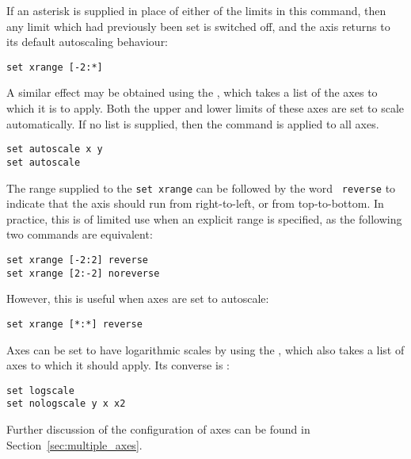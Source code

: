 If an asterisk is supplied in place of either of the limits in this command, then
any limit which had previously been set is switched off, and the axis returns to
its default autoscaling behaviour:

\begin{verbatim}
set xrange [-2:*]
\end{verbatim}

\noindent A similar effect may be obtained using the ,
which takes a list of the axes to which it is to apply. Both the upper and
lower limits of these axes are set to scale automatically. If no list is
supplied, then the command is applied to all axes.

\begin{verbatim}
set autoscale x y
set autoscale
\end{verbatim}

The range supplied to the {\tt set xrange} can be followed by the word {\tt
reverse} to indicate that the axis should run from right-to-left, or from
top-to-bottom. In practice, this is of limited use when an explicit range is
specified, as the following two commands are equivalent:

\begin{verbatim}
set xrange [-2:2] reverse
set xrange [2:-2] noreverse
\end{verbatim}

\noindent However, this is useful when axes are set to autoscale:

\begin{verbatim}
set xrange [*:*] reverse
\end{verbatim}

Axes can be set to have logarithmic scales by using the ,
which also takes a list of axes to which it should apply. Its converse is
:

\begin{verbatim}
set logscale
set nologscale y x x2
\end{verbatim}

Further discussion of the configuration of axes can be found in
Section~\ref{sec:multiple_axes}.

